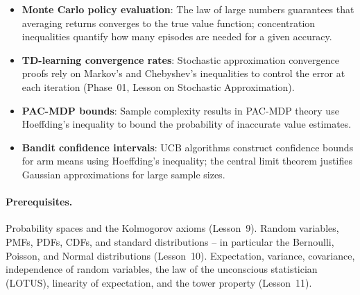 \documentclass[11pt,a4paper]{article}
\begin{document}
\begin{rlconnection}[title={Why Inequalities and Limit Theorems
    Matter for RL/ML}]
\begin{itemize}[nosep]
    \item \textbf{Monte Carlo policy evaluation}: The law of large
    numbers guarantees that averaging returns converges to the true
    value function; concentration inequalities quantify how many
    episodes are needed for a given accuracy.
    \item \textbf{TD-learning convergence rates}: Stochastic
    approximation convergence proofs rely on Markov's and Chebyshev's
    inequalities to control the error at each iteration (Phase~01,
    Lesson on Stochastic Approximation).
    \item \textbf{PAC-MDP bounds}: Sample complexity results in
    PAC-MDP theory use Hoeffding's inequality to bound the
    probability of inaccurate value estimates.
    \item \textbf{Bandit confidence intervals}: UCB algorithms
    construct confidence bounds for arm means using Hoeffding's
    inequality; the central limit theorem justifies Gaussian
    approximations for large sample sizes.
\end{itemize}
\end{rlconnection}

\paragraph{Prerequisites.}
Probability spaces and the Kolmogorov axioms (Lesson~9). Random
variables, PMFs, PDFs, CDFs, and standard distributions -- in
particular the Bernoulli, Poisson, and Normal distributions
(Lesson~10). Expectation, variance, covariance, independence of
random variables, the law of the unconscious statistician (LOTUS),
linearity of expectation, and the tower property (Lesson~11).
\end{document}
